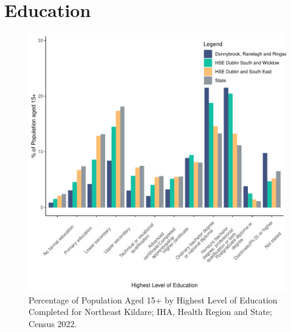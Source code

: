 \documentclass{article}
\begin{document}
\section{Education}\label{sect:Edu}
\begin{figure}[H]
	\centering
	\includegraphics[width = 120mm]{../figures/EduED.pdf}
	\caption{Percentage of Population Aged 15+ by Highest Level of Education Completed for Northeast Kildare; IHA, Health Region and State; Census 2022.}
	\label{fig:vbnv}
	\end{figure}
\end{document}
